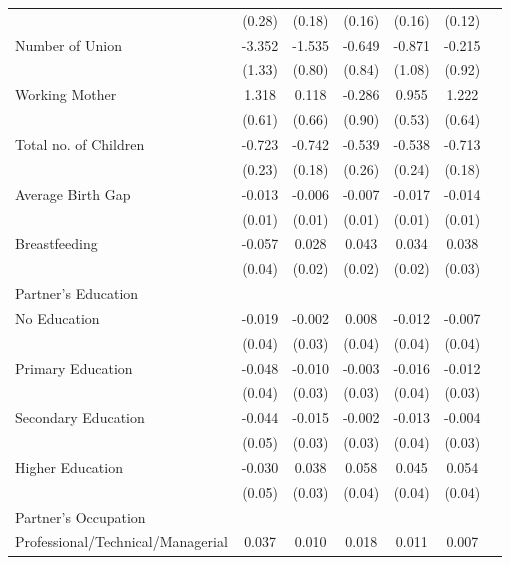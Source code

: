 \begin{longtable}{l*{6}{c}}
                    & (0.28) & (0.18) & (0.16) & (0.16) & (0.12) \\
Number of Union & -3.352\sym{**} & -1.535\sym{*} & -0.649 & -0.871 & -0.215 \\
                    & (1.33) & (0.80) & (0.84) & (1.08) & (0.92) \\
Working Mother & 1.318\sym{**} & 0.118 & -0.286 & 0.955\sym{*} & 1.222\sym{*} \\
                    & (0.61) & (0.66) & (0.90) & (0.53) & (0.64) \\
Total no. of Children & -0.723\sym{***} & -0.742\sym{***} & -0.539\sym{**} & -0.538\sym{**} & -0.713\sym{***} \\
                    & (0.23) & (0.18) & (0.26) & (0.24) & (0.18) \\
Average Birth Gap & -0.013 & -0.006 & -0.007 & -0.017\sym{**} & -0.014 \\
                    & (0.01) & (0.01) & (0.01) & (0.01) & (0.01) \\
Breastfeeding & -0.057 & 0.028 & 0.043\sym{*} & 0.034 & 0.038 \\
                    & (0.04) & (0.02) & (0.02) & (0.02) & (0.03) \\
\multicolumn{6}{l}{Partner's Education} \\
\hspace{1em}No Education & -0.019 & -0.002 & 0.008 & -0.012 & -0.007 \\
                    & (0.04) & (0.03) & (0.04) & (0.04) & (0.04) \\
\hspace{1em}Primary Education & -0.048 & -0.010 & -0.003 & -0.016 & -0.012 \\
                    & (0.04) & (0.03) & (0.03) & (0.04) & (0.03) \\
\hspace{1em}Secondary Education & -0.044 & -0.015 & -0.002 & -0.013 & -0.004 \\
                    & (0.05) & (0.03) & (0.03) & (0.04) & (0.03) \\
\hspace{1em}Higher Education & -0.030 & 0.038 & 0.058 & 0.045 & 0.054 \\
                    & (0.05) & (0.03) & (0.04) & (0.04) & (0.04) \\
\multicolumn{6}{l}{Partner's Occupation} \\
\hspace{1em}Professional/Technical/Managerial & 0.037 & 0.010 & 0.018 & 0.011 & 0.007 \\

\end{longtable}
